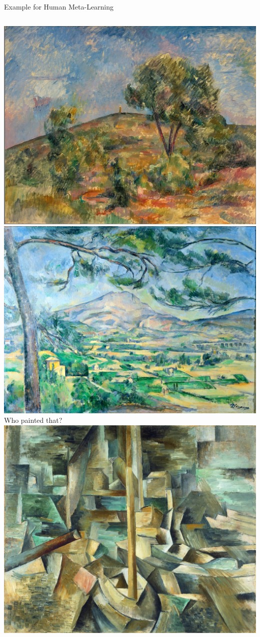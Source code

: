 \begin{frame}[c]{Example for Human Meta-Learning}
\begin{columns}
	\includegraphics[width=1.0\textwidth]{images/cezanne2.jpg}
	\includegraphics[width=1.0\textwidth]{images/cezanne3.jpg}
	\centering
	Who painted that?
	\includegraphics[width=1.0\textwidth]{images/Braque4.jpg}
	

\end{columns}
\end{frame}
